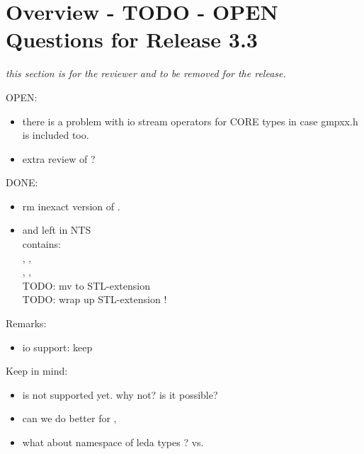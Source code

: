 \section{Overview - TODO - OPEN Questions for Release 3.3}

{\em this section is for the reviewer and to be removed for the release. }


OPEN:
\begin{itemize}
\item there is a problem with io stream operators for CORE types in case 
      gmpxx.h is included too. 
\item extra review of  ?
\end{itemize}


DONE:
\begin{itemize}
\item rm inexact version of . 
\item {} and  left in NTS\\
      contains: \\
      , , \\
      , , \\
      TODO: mv to STL-extension\\
      TODO: wrap up STL-extension ! 
\end{itemize}

Remarks:
\begin{itemize}
\item io support: keep  
\end{itemize}

Keep in mind: 
\begin{itemize}
\item {} is not supported yet. why not? is it possible?  
\item can we do better for , 
\item what about namespace of leda types ? 
      vs. 
\end{itemize}

